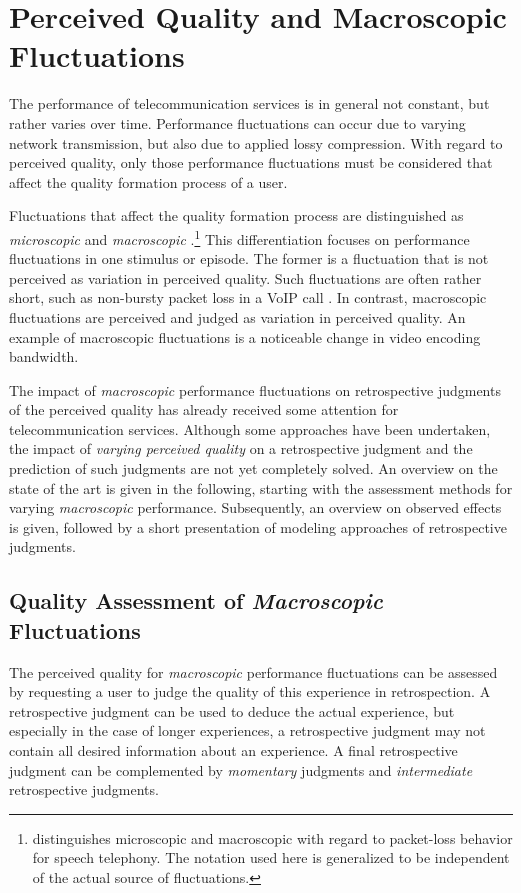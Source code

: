 \section{Perceived Quality and Macroscopic Fluctuations}\label{chap:04}
The performance of telecommunication services is in general not constant, but rather varies over time.
Performance fluctuations can occur due to varying network transmission, but also due to applied lossy compression.
With regard to perceived quality, only those performance fluctuations must be considered that affect the quality formation process of a user.

Fluctuations that affect the quality formation process are distinguished as \emph{microscopic} and \emph{macroscopic} \citep[][p.\,72]{raake_short-_2006}.\footnote{\citet{raake_short-_2006} distinguishes microscopic and macroscopic with regard to packet-loss behavior for speech telephony. The notation used here is generalized to be independent of the actual source of fluctuations.}
This differentiation focuses on performance fluctuations in one stimulus or episode.
The former is a fluctuation that is not perceived as variation in perceived quality.
Such fluctuations are often rather short, such as non-bursty packet loss in a \ac{VoIP} call \citep[\cf{}][p.\,72]{raake_short-_2006}.
In contrast, macroscopic fluctuations are perceived and judged as variation in perceived quality.
An example of macroscopic fluctuations is a noticeable change in video encoding bandwidth.

The impact of \emph{macroscopic} performance fluctuations on retrospective judgments of the perceived quality has already received some attention for telecommunication services.
Although some approaches have been undertaken, the impact of \emph{varying perceived quality} on a retrospective judgment and the prediction of such judgments are not yet completely solved.
An overview on the state of the art is given in the following, starting with the assessment methods for varying \emph{macroscopic} performance.
Subsequently, an overview on observed effects is given, followed by a short presentation of modeling approaches of retrospective judgments.

\subsection{Quality Assessment of \emph{Macroscopic} Fluctuations}
The perceived quality for \emph{macroscopic} performance fluctuations can be assessed by requesting a user to judge the quality of this experience in retrospection.
A retrospective judgment can be used to deduce the actual experience, but especially in the case of longer experiences, a retrospective judgment may not contain all desired information about an experience.
A final retrospective judgment can be complemented by \emph{momentary} judgments and \emph{intermediate} retrospective judgments.

